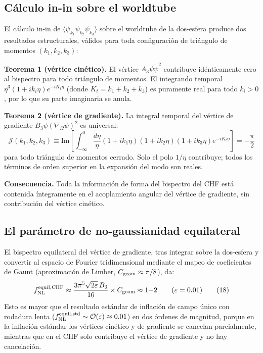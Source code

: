 \documentclass[12pt,a4paper]{article}
\begin{document}
\subsection{Cálculo in-in sobre el worldtube}

El cálculo in-in de $\langle\psi_{k_1}\psi_{k_2}\psi_{k_3}\rangle$ sobre el worldtube de la dos-esfera produce dos resultados estructurales, válidos para toda configuración de triángulo de momentos $(k_1, k_2, k_3)$:

\textbf{Teorema 1 (vértice cinético).} El vértice $A_3\psi\dot\psi^2$ contribuye idénticamente cero al bispectro para todo triángulo de momentos. El integrando temporal $\eta^3(1+ik_i\eta)e^{-iK_t\eta}$ (donde $K_t = k_1+k_2+k_3$) es puramente real para todo $k_i > 0$, por lo que su parte imaginaria se anula.

\textbf{Teorema 2 (vértice de gradiente).} La integral temporal del vértice de gradiente $B_3\psi(\nabla_\Omega\psi)^2$ es universal:
\begin{equation}
\mathcal{J}(k_1,k_2,k_3) \equiv \mathrm{Im}\!\left[\int_{-\infty}^{0}\frac{d\eta}{\eta}(1+ik_1\eta)(1+ik_2\eta)(1+ik_3\eta)e^{-iK_t\eta}\right] = -\frac{\pi}{2} \tag{17}
\end{equation}
para todo triángulo de momentos cerrado. Solo el polo $1/\eta$ contribuye; todos los términos de orden superior en la expansión del modo son reales.

\textbf{Consecuencia.} Toda la información de forma del bispectro del CHF está contenida íntegramente en el acoplamiento angular del vértice de gradiente, sin contribución del vértice cinético.

\subsection{El parámetro de no-gaussianidad equilateral}

El bispectro equilateral del vértice de gradiente, tras integrar sobre la dos-esfera y convertir al espacio de Fourier tridimensional mediante el mapeo de coeficientes de Gaunt (aproximación de Limber, $C_{\rm geom} \approx \pi/8$), da:
\begin{equation}
f_{\rm NL}^{\rm equil, CHF} \approx \frac{3\pi^5\sqrt{2\varepsilon}\,B_3}{16} \times C_{\rm geom} \approx 1{-}2 \qquad (\varepsilon = 0.01) \tag{18}
\end{equation}
Esto es mayor que el resultado estándar de inflación de campo único con rodadura lenta ($f_{\rm NL}^{\rm equil, std} \sim \mathcal{O}(\varepsilon) \approx 0.01$) en dos órdenes de magnitud, porque en la inflación estándar los vértices cinético y de gradiente se cancelan parcialmente, mientras que en el CHF solo contribuye el vértice de gradiente y no hay cancelación.
\end{document}
